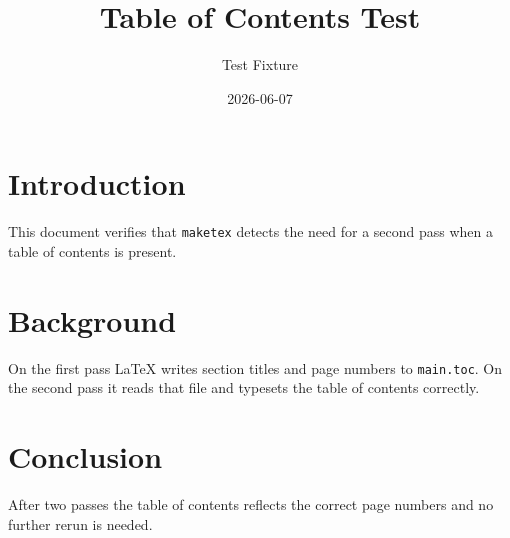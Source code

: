 \documentclass{article}
\title{Table of Contents Test}
\author{Test Fixture}
\date{2026-06-07}
\begin{document}
\maketitle
\tableofcontents

\section{Introduction}
This document verifies that \texttt{maketex} detects the need for a second
pass when a table of contents is present.

\section{Background}
On the first pass \LaTeX{} writes section titles and page numbers to
\texttt{main.toc}.  On the second pass it reads that file and typesets the
table of contents correctly.

\section{Conclusion}
After two passes the table of contents reflects the correct page numbers and
no further rerun is needed.
\end{document}
